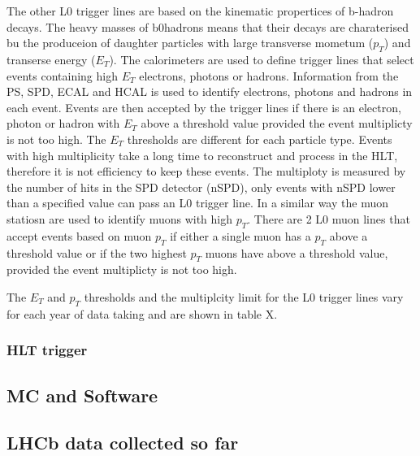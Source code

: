 The other L0 trigger lines are based on the kinematic propertices of b-hadron decays. The heavy masses of b0hadrons means that their decays are charaterised bu the produceion of daughter particles with large transverse mometum ($p_{T}$) and transerse energy ($E_{T}$).
The calorimeters are used to define trigger lines that select events containing high $E_{T}$ electrons, photons or hadrons. Information from the PS, SPD, ECAL and HCAL is used to identify electrons, photons and hadrons in each event. Events are then accepted by the trigger lines if there is an  electron, photon or hadron with $E_{T}$ above a threshold value provided the event multiplicty is not too high. The $E_{T}$ thresholds are different for each particle type. Events with high multiplicity take a long time to reconstruct and process in the HLT, therefore it is not efficiency to keep these events. The multiploty is measured by the number of hits in the SPD detector (nSPD), only events with nSPD lower than a specified value can pass an L0 trigger line. 
In a similar way the muon statiosn are used to identify muons with high $p_{T}$. There are 2 L0 muon lines that accept events based on muon $p_{T}$ if either a single muon has a $p_{T}$  above a threshold value or if the two highest $p_{T}$  muons have above a threshold value, provided the event multiplicty is not too high. %

The  $E_{T}$ and $p_{T}$ thresholds and the multiplcity limit for the L0 trigger lines vary for each year of data taking and are shown in table X. 


\subsubsection{HLT trigger}


\subsection{MC and Software}

\subsection{LHCb data collected so far}

